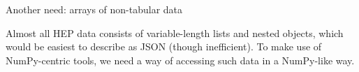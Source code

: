 \begin{frame}{Another need: arrays of non-tabular data}
\large
\vspace{0.25 cm}

Almost all HEP data consists of variable-length lists and nested objects, which would be easiest to describe as JSON (though inefficient). To make use of NumPy-centric tools, we need a way of accessing such data in a NumPy-like way.

\begin{columns}
\end{columns}
\end{frame}

